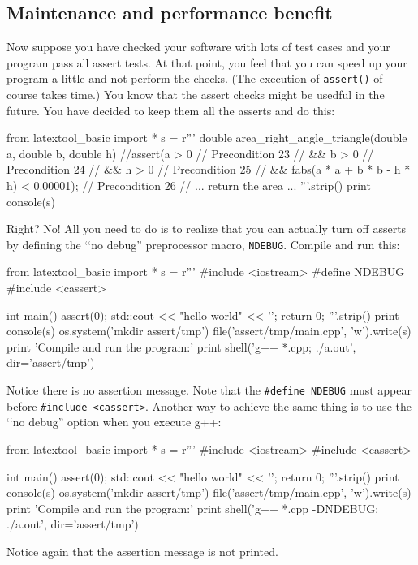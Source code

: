 \subsection{Maintenance and performance benefit}

Now suppose you have checked your software with lots of test cases
and your program pass all assert tests.
At that point, you feel that you can speed up your program a little
and not perform the checks.
(The execution of \verb!assert()! of course takes time.)
You know that the assert checks might be usedful in the future.
You have decided to keep them all the asserts and do this:
{\small
\begin{python}
from latextool_basic import *
s = r'''
double area_right_angle_triangle(double a, double b, double h)
{
    //assert(a > 0                                      // Precondition 23
    //       && b > 0                                   // Precondition 24
    //       && h > 0                                   // Precondition 25
    //       && fabs(a * a + b * b - h * h) < 0.00001); // Precondition 26
    // ... return the area ...
}
'''.strip()
print console(s)
\end{python}
}
Right? 
No! All you need to do is to realize that you can actually turn off
asserts by defining the \lq\lq no debug'' preprocessor macro, \verb!NDEBUG!.
Compile and run this:
\begin{python}
from latextool_basic import *
s = r'''
#include <iostream>
#define NDEBUG
#include <cassert>

int main()
{
    assert(0);
    std::cout << "hello world" << '\n';
    return 0;
}
'''.strip()
print console(s)
os.system('mkdir assert/tmp')
file('assert/tmp/main.cpp', 'w').write(s)
print 'Compile and run the program:'
print shell('g++ *.cpp; ./a.out', dir='assert/tmp')
\end{python}
Notice there is no assertion message.
Note that the \verb!#define NDEBUG! must appear before \verb!#include <cassert>!.
Another way to achieve the same thing is to use the \lq\lq no debug'' option
when you execute g++:
\begin{python}
from latextool_basic import *
s = r'''
#include <iostream>
#include <cassert>

int main()
{
    assert(0);
    std::cout << "hello world" << '\n';
    return 0;
}
'''.strip()
print console(s)
os.system('mkdir assert/tmp')
file('assert/tmp/main.cpp', 'w').write(s)
print 'Compile and run the program:'
print shell('g++ *.cpp -DNDEBUG; ./a.out', dir='assert/tmp')
\end{python}
Notice again that the assertion message is not printed.


